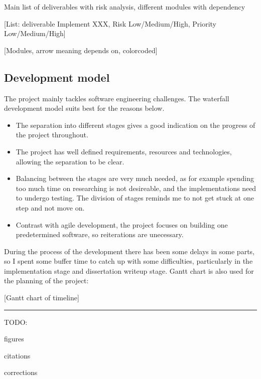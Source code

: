 \documentclass[runningheads]{llncs}
\begin{document}
Main list of deliverables with risk analysis, different modules with dependency

[List: deliverable Implement XXX, Risk Low/Medium/High, Priority Low/Medium/High]

[Modules, arrow meaning depends on, colorcoded]

\subsection{Development model}

The project mainly tackles software engineering challenges. The waterfall development model suits best for the reasons below. 

\begin{itemize}
\item The separation into different stages gives a good indication on the progress of the project throughout. 
\item The project has well defined requirements, resources and technologies, allowing the separation to be clear.
\item Balancing between the stages are very much needed, as for example spending too much time on researching is not desireable, and the implementations need to undergo testing. The division of stages reminds me to not get stuck at one step and not move on.
\item Contrast with agile development, the project focuses on building one predetermined software, so reiterations are unecessary.
\end{itemize}

During the process of the development there has been some delays in some parts, so I spent some buffer time to catch up with some difficulties, particularly in the implementation stage and dissertation writeup stage. Gantt chart is also used for the planning of the project:

[Gantt chart of timeline]

\noindent\rule{12cm}{0.4pt}

TODO:

figures

citations

corrections
\end{document}
